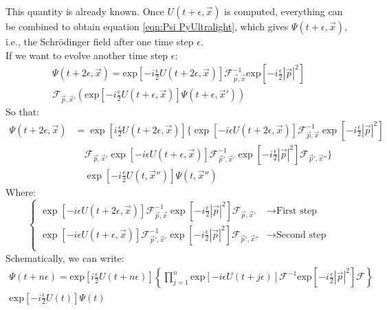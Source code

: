\documentclass[12pt]{article}
\begin{document}
This quantity is already known. Once \( U(t+\epsilon,\vec{x}) \) is computed, everything can be combined to obtain equation \ref{eqn:Psi PyUltralight}, which gives \( \Psi(t+\epsilon,\vec{x}) \), i.e., the Schrödinger field after one time step \( \epsilon \).\\
If we want to evolve another time step \( \epsilon \):
\begin{multline}
\Psi(t+2\epsilon,\vec{x})=\text{exp}\left[-i\frac{\epsilon}{2}U(t+2\epsilon,\vec{x}) \right] \mathcal{F}^{-1}_{\vec{p},\vec{x}}\text{exp}\left[-i\frac{\epsilon}{2}|\vec{p}|^2 \right] \\ \mathcal{F}_{\vec{p},\vec{x}'}\left(\text{exp}\left[ -i\frac{\epsilon}{2}U(t+\epsilon,\vec{x})\right] \Psi(t+\epsilon,\vec{x}') \right) 
\end{multline}
So that:
\begin{equation}
\begin{aligned}
\Psi(t+2\epsilon,\vec{x}) &= \exp\left[i\frac{\epsilon}{2}U(t+2\epsilon,\vec{x}) \right]  
\bigg\{ 
    \exp\left[-i\epsilon U(t+2\epsilon,\vec{x}) \right] 
    \mathcal{F}_{\vec{p},\vec{x}}^{-1}
    \exp\left[-i\frac{\epsilon}{2}|\vec{p}|^2 \right] \\
    &\quad
    \mathcal{F}_{\vec{p},\vec{x}'} 
    \exp\left[-i\epsilon U(t+\epsilon,\vec{x}) \right] 
    \mathcal{F}_{\vec{p}',\vec{x}'}^{-1}
    \exp\left[-i\frac{\epsilon}{2}|\vec{p}|^2 \right] 
    \mathcal{F}_{\vec{p}',\vec{x}''} \bigg\} \\
    &\quad
    \exp\left[-i\frac{\epsilon}{2}U(t,\vec{x}'') \right] 
    \Psi(t,\vec{x}'')
\end{aligned}
\end{equation}
Where:
\begin{equation}
    \left\{ \begin{array}{rcl}
\exp\left[-i\epsilon U(t+2\epsilon,\vec{x}) \right] 
    \mathcal{F}_{\vec{p},\vec{x}}^{-1}
    \exp\left[-i\frac{\epsilon}{2}|\vec{p}|^2 \right] \mathcal{F}_{\vec{p},\vec{x}'} &\rightarrow \text{First step} \\
\exp\left[-i\epsilon U(t+\epsilon,\vec{x}) \right] 
    \mathcal{F}_{\vec{p}',\vec{x}'}^{-1}
    \exp\left[-i\frac{\epsilon}{2}|\vec{p}|^2 \right] 
    \mathcal{F}_{\vec{p}',\vec{x}''} &\rightarrow \text{Second step} \\
\end{array}\right.
\end{equation}
Schematically, we can write:
\begin{multline}
    \Psi(t+n\epsilon)=\text{exp}\left[i\frac{\epsilon}{2}U(t+n\epsilon) \right] \left\{\prod_{j=1}^{n}\text{exp}\left[-i\epsilon U(t+j\epsilon) \right] \mathcal{F}^{-1}\text{exp}\left[-i\frac{\epsilon}{2}|\vec{p}|^2 \right] \mathcal{F}\right\} \\ \text{exp}\left[-i\frac{\epsilon}{2}U(t) \right]\Psi(t)
\end{multline}
\end{document}
